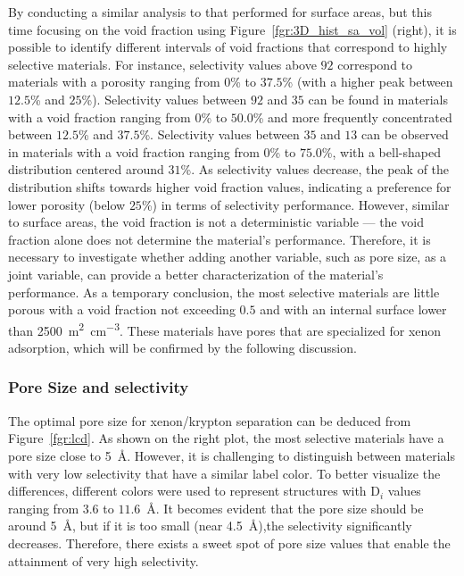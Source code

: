 \documentclass[main.tex]{subfiles}
\begin{document}
By conducting a similar analysis to that performed for surface areas, but this time focusing on the void fraction using Figure~\ref{fgr:3D_hist_sa_vol} (right), it is possible to identify different intervals of void fractions that correspond to highly selective materials. For instance, selectivity values above $92$ correspond to materials with a porosity ranging from {$0$\%} to {$37.5$\%} (with a higher peak between {$12.5$\%} and {$25$\%}). Selectivity values between $92$ and $35$ can be found in materials with a void fraction ranging from {$0$\%} to {$50.0$\%} and more frequently concentrated between {$12.5$\%} and {$37.5$\%}. Selectivity values between $35$ and $13$ can be observed in materials with a void fraction ranging from {$0$\%} to {$75.0$\%}, with a bell-shaped distribution centered around {$31$\%}. As selectivity values decrease, the peak of the distribution shifts towards higher void fraction values, indicating a preference for lower porosity (below {$25$\%}) in terms of selectivity performance. However, similar to surface areas, the void fraction is not a deterministic variable — the void fraction alone does not determine the material's performance. Therefore, it is necessary to investigate whether adding another variable, such as pore size, as a joint variable, can provide a better characterization of the material's performance. As a temporary conclusion, the most selective materials are little porous with a void fraction not exceeding $0.5$ and with an internal surface lower than \SI{2500}{\square\m\per\cubic\cm}. These materials have pores that are specialized for xenon adsorption, which will be confirmed by the following discussion.

\subsubsection{Pore Size and selectivity}

The optimal pore size for xenon/krypton separation can be deduced from Figure~\ref{fgr:lcd}. As shown on the right plot, the most selective materials have a pore size close to \SI{5}{\angstrom}. However, it is challenging to distinguish between materials with very low selectivity that have a similar label color. To better visualize the differences, different colors were used to represent structures with D$_i$ values ranging from $3.6$ to $11.6$~\si{\angstrom}. It becomes evident that the pore size should be around \SI{5}{\angstrom}, but if it is too small (near \SI{4.5}{\angstrom}),the selectivity significantly decreases. Therefore, there exists a sweet spot of pore size values that enable the attainment of very high selectivity.
\end{document}
